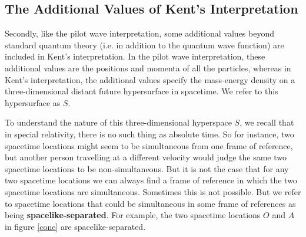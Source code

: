 \subsection{The Additional Values of Kent's Interpretation\label{additional}}
Secondly, like the pilot wave interpretation, some additional values beyond standard quantum theory (i.e. in addition to the quantum wave function) are included in Kent's interpretation. In the pilot wave interpretation, these additional values are the positions and momenta of all the particles, whereas in Kent's interpretation, the additional values specify the mass-energy density on a three-dimensional distant future hypersurface in spacetime. We refer to this hypersurface as $S$. 

To understand the nature of this three-dimensional hyperspace $S$, we recall that in special relativity, there is no such thing as absolute time. So for instance, two spacetime locations might seem to be simultaneous from one frame of reference, but another person travelling at a different velocity would judge the same two spacetime locations to be non-simultaneous. But it is not the case that for any two spacetime locations we can always find a frame of reference in which the two spacetime locations are simultaneous. Sometimes this is not possible. But we refer to spacetime locations that could be simultaneous in some frame of references as being \textbf{spacelike-separated}. For example, the two spacetime locations $O$ and $A$  in figure \ref{cone} are spacelike-separated. 


